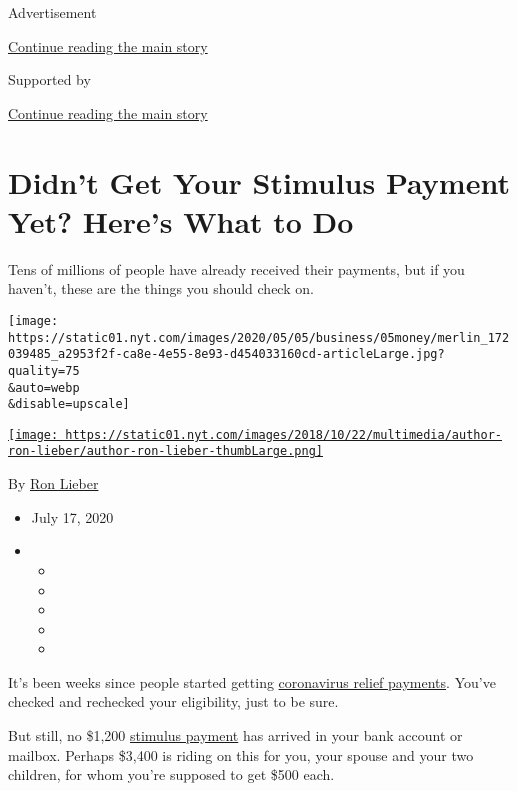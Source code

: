 Advertisement

\protect\hyperlink{after-top}{Continue reading the main story}

Supported by

\protect\hyperlink{after-sponsor}{Continue reading the main story}

\hypertarget{didnt-get-your-stimulus-payment-yet-heres-what-to-do}{%
\section{Didn't Get Your Stimulus Payment Yet? Here's What to
Do}\label{didnt-get-your-stimulus-payment-yet-heres-what-to-do}}

Tens of millions of people have already received their payments, but if
you haven't, these are the things you should check on.

\texttt{[image: https://static01.nyt.com/images/2020/05/05/business/05money/merlin\_172039485\_a2953f2f-ca8e-4e55-8e93-d454033160cd-articleLarge.jpg?quality=75\\\&auto=webp\\\&disable=upscale]}

\href{https://www.nytimes.com/by/ron-lieber}{\texttt{[image: https://static01.nyt.com/images/2018/10/22/multimedia/author-ron-lieber/author-ron-lieber-thumbLarge.png]}}

By \href{https://www.nytimes.com/by/ron-lieber}{Ron Lieber}

\begin{itemize}
\item
  July 17, 2020
\item
  \begin{itemize}
  \item
  \item
  \item
  \item
  \item
  \end{itemize}
\end{itemize}

It's been weeks since people started getting
\href{https://www.nytimes.com/article/coronavirus-stimulus-package-questions-answers.html}{coronavirus
relief payments}. You've checked and rechecked your eligibility, just to
be sure.

But still, no \$1,200
\href{https://www.nytimes.com/2020/07/17/us/politics/mnuchin-congress-stimulus.html}{stimulus
payment} has arrived in your bank account or mailbox. Perhaps \$3,400 is
riding on this for you, your spouse and your two children, for whom
you're supposed to get \$500 each.

